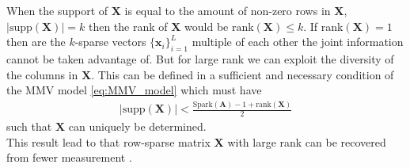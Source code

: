 When the support of $\mathbf{X}$ is equal to the amount of non-zero rows in $\mathbf{X}$, $\vert \text{supp}(\mathbf{X})\vert = k$ then the rank of $\mathbf{X}$ would be $\text{rank}(\mathbf{X}) \leq k$. If rank$(\mathbf{X}) = 1$ then are the $k$-sparse vectors $\lbrace \mathbf{x}_i \rbrace_{i=1}^L$ multiple of each other the joint information cannot be taken advantage of. But for large rank we can exploit the diversity of the columns in $\mathbf{X}$. This can be defined in a sufficient and necessary condition of the MMV model \eqref{eq:MMV_model} which must have
\begin{align*}
\vert \text{supp}(\mathbf{X}) \vert < \frac{\text{Spark} (\mathbf{A}) - 1 + \text{rank}(\mathbf{X})}{2}
\end{align*}
such that $\mathbf{X}$ can uniquely be determined.
\\
This result lead to that row-sparse matrix $\mathbf{X}$ with large rank can be recovered from fewer measurement \cite[p. 43]{CS}.


